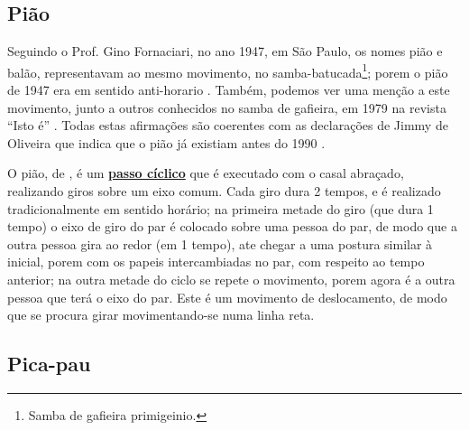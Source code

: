  
\subsection{Pião}

Seguindo o Prof. Gino Fornaciari, no ano 1947,  em São Paulo, os nomes pião e balão,
representavam ao mesmo movimento, no samba-batucada\footnote{Samba de gafieira primigeinio.}; 
porem o pião de 1947 era em sentido anti-horario \cite[pp. 68-72]{fornaciari1947aprender}.
Também, podemos ver uma menção a este movimento, junto a outros conhecidos no samba de gafieira, 
em 1979 na revista ``Isto é'' \cite[pp. 89]{revista1979isto}.
Todas estas afirmações são coerentes com as declarações de Jimmy de Oliveira 
que indica que o pião já existiam antes do 1990 \cite{sambafunkeadoJimmyDeOliveiraPart1}.

O pião, de \AnoLivro, é um \hyperref[def:PassoCiclico]{\textbf{passo cíclico}} que é executado com o casal abraçado, 
realizando giros sobre um eixo comum.
Cada giro dura 2 tempos, e é realizado tradicionalmente em sentido horário;
na primeira metade do giro (que dura 1 tempo) o eixo de giro do par é colocado sobre uma pessoa do par, 
de modo que a outra pessoa gira ao redor (em 1 tempo), ate chegar a uma postura similar à inicial, 
porem com os papeis intercambiadas no par, com respeito ao tempo anterior;
na outra metade do ciclo se repete o movimento, porem agora é a outra pessoa que terá o eixo do par.
Este é um movimento de deslocamento, de modo que se procura girar movimentando-se numa linha reta.

\subsection{Pica-pau} 

